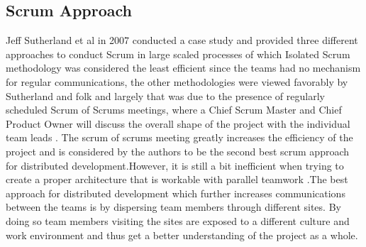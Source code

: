 \documentclass[sigplan,screen]{acmart}
\begin{document}
\begin {comment}
Block comment for the sake of removing this section and expanding the next one.
\subsection{Selecting Team Members}
The main responsibility of the manager of a project is to create a cohesive group of teams and organize them so they can work together effectively. Due to budget constraints and lack of specific skills, companies outsource teams from different regions and managers do not have the complete say in the process of team selection. The problem arises when individuals are motivated by their own work and who have their own ideas about how technical problems should be solved. The manager should select teams and their members based on having similar complementary personalities and not rely solely on technical capabilities. Individuals who are interaction-oriented help facilitate communication within the team and are the key in holding the sanity of the entire team together \cite{Somerville}. \\
When building a team, each participant's potential contribution to the process has to be evaluated.The ideal team member is a part of the team and identifies himself/herself with the team's goals, represents colleagues and has the time to participate through the entire process \cite{Gautam17}.\\
The key factors to select the team members are education,\\
training, application domain, technology experience, communication ability, adaptability and problem solving skills \cite{Somerville}.  
\end{comment}

\subsection{Scrum Approach}
Jeff Sutherland et al in 2007 conducted a case study and provided three different approaches to conduct Scrum in large scaled processes of which Isolated Scrum methodology was considered the least efficient since the teams had no mechanism for regular communications, the other methodologies were viewed favorably by Sutherland and folk and largely that was due to the presence of regularly scheduled Scrum of Scrums meetings, where a Chief Scrum Master and Chief Product Owner will discuss the overall shape of the project with the individual team leads \cite{Jeff}. The scrum of scrums meeting greatly increases the efficiency of the project and is considered by the authors to be the second best scrum approach for distributed development.However, it is still a bit inefficient when trying to create a proper architecture that is workable with parallel teamwork \cite{Dingsoyr}.The best approach for distributed development which further increases communications between the teams is by dispersing team members through different sites. By doing so team members visiting the sites are exposed to a different culture and work environment and thus get a better understanding of the project as a whole.
\end{document}
